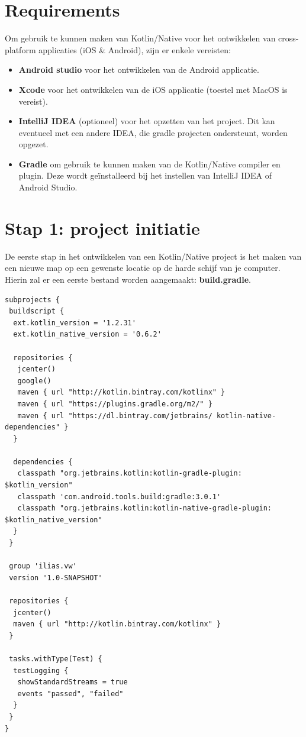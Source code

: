 \section{Requirements}
Om gebruik te kunnen maken van Kotlin/Native voor het ontwikkelen van cross-platform applicaties (iOS \& Android), zijn er enkele vereisten:
\begin{itemize}
	\item \textbf{Android studio} voor het ontwikkelen van de Android applicatie.
	\item \textbf{Xcode} voor het ontwikkelen van de iOS applicatie (toestel met MacOS is vereist).
	\item \textbf{IntelliJ IDEA} (optioneel) voor het opzetten van het project. Dit kan eventueel met een andere IDEA, die gradle projecten ondersteunt, worden opgezet.
	\item \textbf{Gradle} om gebruik te kunnen maken van de Kotlin/Native compiler en plugin. Deze wordt geïnstalleerd bij het instellen van IntelliJ IDEA of Android Studio.
\end{itemize}

\section{Stap 1: project initiatie}
De eerste stap in het ontwikkelen van een Kotlin/Native project is het maken van een nieuwe map op een gewenste locatie op de harde schijf van je computer. Hierin zal er een eerste bestand worden aangemaakt: \textbf{build.gradle}.

\begin{lstlisting}
subprojects {
 buildscript {
  ext.kotlin_version = '1.2.31'
  ext.kotlin_native_version = '0.6.2'
		
  repositories {
   jcenter()
   google()
   maven { url "http://kotlin.bintray.com/kotlinx" }
   maven { url "https://plugins.gradle.org/m2/" }
   maven { url "https://dl.bintray.com/jetbrains/ kotlin-native-dependencies" }
  }

  dependencies {
   classpath "org.jetbrains.kotlin:kotlin-gradle-plugin: $kotlin_version"
   classpath 'com.android.tools.build:gradle:3.0.1'
   classpath "org.jetbrains.kotlin:kotlin-native-gradle-plugin: $kotlin_native_version"
  }
 }
	
 group 'ilias.vw'
 version '1.0-SNAPSHOT'
	
 repositories {
  jcenter()
  maven { url "http://kotlin.bintray.com/kotlinx" }
 }
	
 tasks.withType(Test) {
  testLogging {
   showStandardStreams = true
   events "passed", "failed"
  }
 }
}
\end{lstlisting}
